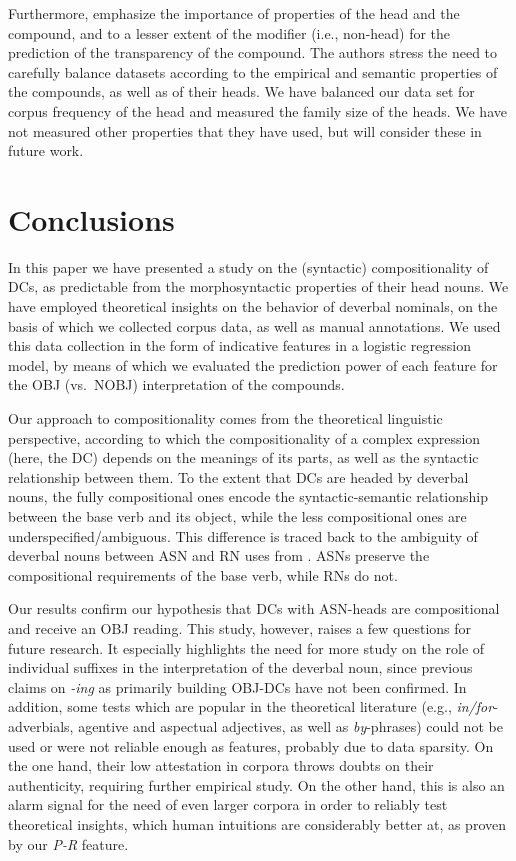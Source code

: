 \documentclass[output=paper]{langsci/langscibook}
\begin{document}
Furthermore, \cite{SchulteImWaldeEtAl:16} emphasize the importance of properties of the head and the compound, and to a lesser extent of the modifier (i.e., non-head) for the prediction of the  transparency of the compound.  The authors stress the need to carefully balance  datasets according to the empirical and semantic properties of the compounds, as well as of their heads. We have balanced our data set for corpus frequency of the head   and measured the family size of the heads. We have not measured  other properties that they have used, but will consider these in future work. 

\section{Conclusions}\label{sec:conclusions}

In this paper we have presented a study on the  {(syntactic)} compositionality of DCs, as predictable from the morphosyntactic properties of their head nouns. We have employed theoretical insights on the behavior of deverbal nominals, on the basis of which we collected corpus data, as well as manual annotations. We used this data collection in the form  of indicative features in a logistic regression model, by means of which we evaluated the prediction power of each feature for the OBJ (vs.~NOBJ) interpretation of the compounds. 

Our approach to compositionality comes from the theoretical linguistic perspective, according to which the compositionality of a complex expression (here, the DC) depends on the meanings of its parts, as well as the syntactic relationship between them. To the extent that DCs are headed by deverbal nouns, the fully compositional ones encode the syntactic-semantic relationship between the base verb and its object,  while the less compositional ones are underspecified/ambiguous. This difference is traced back to the ambiguity of deverbal nouns between ASN and RN uses from \cite{grimshaw:90}. ASNs preserve the compositional requirements of the base verb, while RNs do not.


Our results confirm our hypothesis that DCs with ASN-heads are compositional and receive an OBJ reading. This study, however, raises a few questions for future research. It  especially highlights the need for more study on the role of individual suffixes in the interpretation of the deverbal noun, since previous claims on {\textit{-ing}} as primarily building OBJ-DCs have not been confirmed. 
In addition, some tests which are popular in the theoretical literature (e.g., \textit{in/for}-adverbials, agentive and aspectual adjectives, as well as \textit{by}-phrases) could not be used  or were not reliable enough as features, probably due to data sparsity.  On the one hand, their low attestation in corpora throws  doubts on their authenticity, requiring further empirical study. On the other hand, this is also an alarm signal for the need of even larger corpora in order to reliably test theoretical insights, which human intuitions are considerably better at, as proven by our \textit{P-R} feature.
\end{document}

